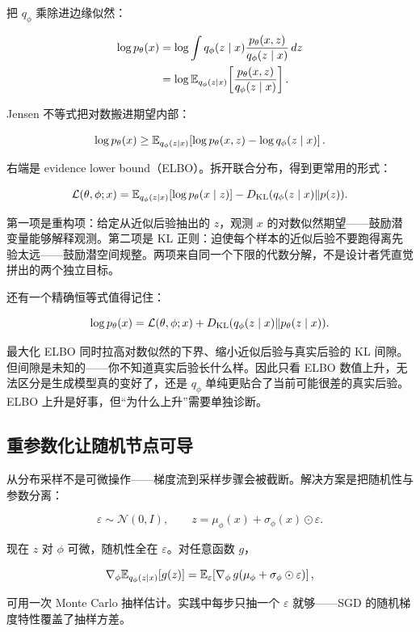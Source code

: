把 \(q_\phi\) 乘除进边缘似然：

\[
\begin{aligned}
\log p_\theta(x)
&= \log\int q_\phi(z\mid x)\frac{p_\theta(x,z)}{q_\phi(z\mid x)}\,dz\\
&= \log\mathbb{E}_{q_\phi(z\mid x)}\!\left[\frac{p_\theta(x,z)}{q_\phi(z\mid x)}\right].
\end{aligned}
\]

Jensen 不等式把对数搬进期望内部：

\[
\log p_\theta(x) \ge \mathbb{E}_{q_\phi(z\mid x)}\!\left[\log p_\theta(x,z) - \log q_\phi(z\mid x)\right].
\]

右端是 evidence lower bound（ELBO）。拆开联合分布，得到更常用的形式：

\[
\mathcal L(\theta,\phi;x) = \mathbb{E}_{q_\phi(z\mid x)}[\log p_\theta(x\mid z)] - D_{\mathrm{KL}}(q_\phi(z\mid x)\Vert p(z)).
\]

第一项是重构项：给定从近似后验抽出的 \(z\)，观测 \(x\) 的对数似然期望——鼓励潜变量能够解释观测。第二项是 KL 正则：迫使每个样本的近似后验不要跑得离先验太远——鼓励潜空间规整。两项来自同一个下限的代数分解，不是设计者凭直觉拼出的两个独立目标。

还有一个精确恒等式值得记住：

\[
\log p_\theta(x) = \mathcal L(\theta,\phi;x) + D_{\mathrm{KL}}(q_\phi(z\mid x)\Vert p_\theta(z\mid x)).
\]

最大化 ELBO 同时拉高对数似然的下界、缩小近似后验与真实后验的 KL 间隙。但间隙是未知的——你不知道真实后验长什么样。因此只看 ELBO 数值上升，无法区分是生成模型真的变好了，还是 \(q_\phi\) 单纯更贴合了当前可能很差的真实后验。ELBO 上升是好事，但``为什么上升''需要单独诊断。

\subsection{重参数化让随机节点可导}

从分布采样不是可微操作——梯度流到采样步骤会被截断。解决方案是把随机性与参数分离：

\[
\varepsilon \sim \mathcal N(0,I),\qquad
z = \mu_\phi(x) + \sigma_\phi(x)\odot\varepsilon.
\]

现在 \(z\) 对 \(\phi\) 可微，随机性全在 \(\varepsilon\)。对任意函数 \(g\)，

\[
\nabla_\phi\mathbb{E}_{q_\phi(z\mid x)}[g(z)] = \mathbb{E}_{\varepsilon}\!\left[\nabla_\phi\,g(\mu_\phi+\sigma_\phi\odot\varepsilon)\right],
\]

可用一次 Monte Carlo 抽样估计。实践中每步只抽一个 \(\varepsilon\) 就够——SGD 的随机梯度特性覆盖了抽样方差。

